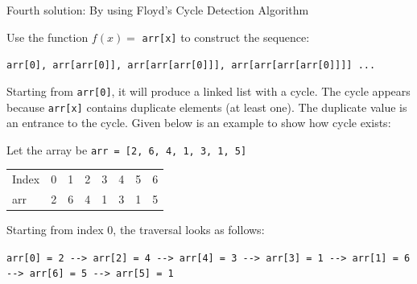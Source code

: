\documentclass[a4paper,11pt]{book}
\begin{document}
\noindent Fourth solution: By using Floyd's Cycle Detection Algorithm

\noindent Use the function $f(x) = $ \lstinline{arr[x]} to construct the sequence:
\vspace{3mm}

\lstinline{arr[0], arr[arr[0]], arr[arr[arr[0]]], arr[arr[arr[arr[0]]]] ... }
\vspace{3mm}

\noindent Starting from \lstinline{arr[0]}, it will produce a linked list with a cycle. The cycle appears because \lstinline{arr[x]} contains duplicate elements (at least one). The duplicate value is an entrance to the cycle. Given below is an example to show how cycle exists: 

\noindent Let the array be \lstinline{arr = [2, 6, 4, 1, 3, 1, 5]}

\begin{table}[H]
\begin{tabular}{llllllll}
Index & 0 & 1 & 2 & 3 & 4 & 5 & 6 \\
arr   & 2 & 6 & 4 & 1 & 3 & 1 & 5
\end{tabular}
\end{table}

\noindent Starting from index 0, the traversal looks as follows:
\vspace{3mm}

\noindent \lstinline{arr[0] = 2 --> arr[2] = 4 --> arr[4] = 3 --> arr[3] = 1 --> arr[1] = 6 --> arr[6] = 5 --> arr[5] = 1}
\vspace{5mm}

\begin{center}
\end{center}

\vspace{5mm}
\end{document}
